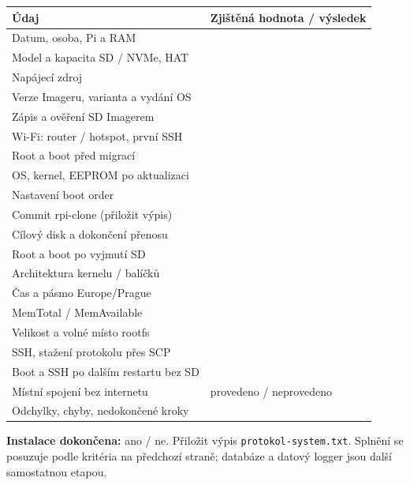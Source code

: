 \documentclass[11pt,a4paper]{article}
\begin{document}
\begin{tabularx}{\textwidth}{L{64mm}Y}
\toprule Údaj & Zjištěná hodnota / výsledek\\\midrule
Datum, osoba, Pi a RAM & \rule{0pt}{7mm}\\
Model a kapacita SD / NVMe, HAT & \rule{0pt}{7mm}\\
Napájecí zdroj & \rule{0pt}{7mm}\\
Verze Imageru, varianta a vydání OS & \rule{0pt}{7mm}\\
Zápis a ověření SD Imagerem & \rule{0pt}{7mm}\\
Wi-Fi: router / hotspot, první SSH & \rule{0pt}{7mm}\\
Root a boot před migrací & \rule{0pt}{7mm}\\
OS, kernel, EEPROM po aktualizaci & \rule{0pt}{7mm}\\
Nastavení boot order & \rule{0pt}{7mm}\\
Commit rpi-clone (přiložit výpis) & \rule{0pt}{7mm}\\
Cílový disk a dokončení přenosu & \rule{0pt}{7mm}\\
Root a boot po vyjmutí SD & \rule{0pt}{7mm}\\
Architektura kernelu / balíčků & \rule{0pt}{7mm}\\
Čas a pásmo Europe/Prague & \rule{0pt}{7mm}\\
MemTotal / MemAvailable & \rule{0pt}{7mm}\\
Velikost a volné místo rootfs & \rule{0pt}{7mm}\\
SSH, stažení protokolu přes SCP & \rule{0pt}{7mm}\\
Boot a SSH po dalším restartu bez SD & \rule{0pt}{7mm}\\
Místní spojení bez internetu & \rule{0pt}{7mm}provedeno / neprovedeno\\
Odchylky, chyby, nedokončené kroky & \rule{0pt}{12mm}\\
\bottomrule
\end{tabularx}

\textbf{Instalace dokončena:} ano / ne. Přiložit výpis \texttt{protokol-system.txt}. Splnění se posuzuje podle kritéria na předchozí straně; databáze a datový logger jsou další samostatnou etapou.

\clearpage
\end{document}
